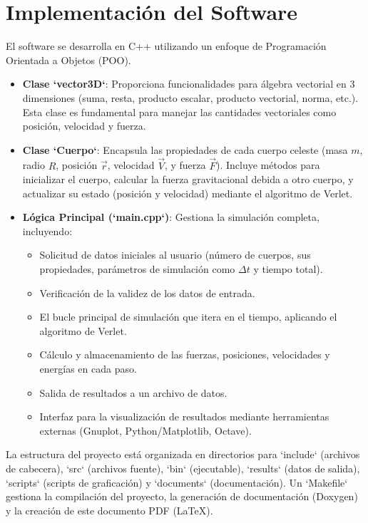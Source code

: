 \documentclass{article}
\begin{document}
\section{Implementación del Software}
El software se desarrolla en C++ utilizando un enfoque de Programación Orientada a Objetos (POO).
\begin{itemize}
    \item \textbf{Clase `vector3D`}: Proporciona funcionalidades para álgebra vectorial en 3 dimensiones (suma, resta, producto escalar, producto vectorial, norma, etc.). Esta clase es fundamental para manejar las cantidades vectoriales como posición, velocidad y fuerza.
    \item \textbf{Clase `Cuerpo`}: Encapsula las propiedades de cada cuerpo celeste (masa $m$, radio $R$, posición $\vec{r}$, velocidad $\vec{V}$, y fuerza $\vec{F}$). Incluye métodos para inicializar el cuerpo, calcular la fuerza gravitacional debida a otro cuerpo, y actualizar su estado (posición y velocidad) mediante el algoritmo de Verlet.
    \item \textbf{Lógica Principal (`main.cpp`)}: Gestiona la simulación completa, incluyendo:
    \begin{itemize}
        \item Solicitud de datos iniciales al usuario (número de cuerpos, sus propiedades, parámetros de simulación como $\Delta t$ y tiempo total).
        \item Verificación de la validez de los datos de entrada.
        \item El bucle principal de simulación que itera en el tiempo, aplicando el algoritmo de Verlet.
        \item Cálculo y almacenamiento de las fuerzas, posiciones, velocidades y energías en cada paso.
        \item Salida de resultados a un archivo de datos.
        \item Interfaz para la visualización de resultados mediante herramientas externas (Gnuplot, Python/Matplotlib, Octave).
    \end{itemize}
\end{itemize}
La estructura del proyecto está organizada en directorios para `include` (archivos de cabecera), `src` (archivos fuente), `bin` (ejecutable), `results` (datos de salida), `scripts` (scripts de graficación) y `documents` (documentación). Un `Makefile` gestiona la compilación del proyecto, la generación de documentación (Doxygen) y la creación de este documento PDF (LaTeX).
\end{document}
